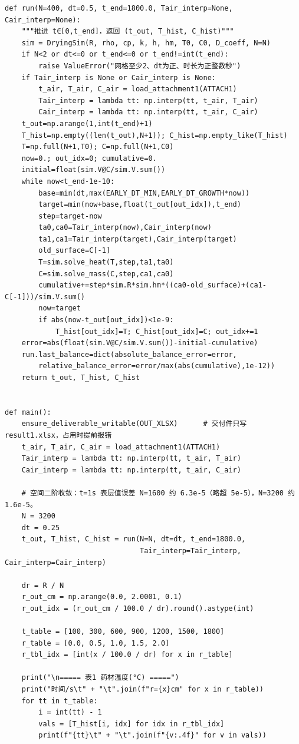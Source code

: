 \documentclass[12pt,a4paper]{ctexart}
\begin{document}
\begin{lstlisting}[caption={solve\_problem1.py }]
def run(N=400, dt=0.5, t_end=1800.0, Tair_interp=None, Cair_interp=None):
    """推进 t∈[0,t_end]，返回 (t_out, T_hist, C_hist)"""
    sim = DryingSim(R, rho, cp, k, h, hm, T0, C0, D_coeff, N=N)
    if N<2 or dt<=0 or t_end<=0 or t_end!=int(t_end):
        raise ValueError("网格至少2、dt为正、时长为正整数秒")
    if Tair_interp is None or Cair_interp is None:
        t_air, T_air, C_air = load_attachment1(ATTACH1)
        Tair_interp = lambda tt: np.interp(tt, t_air, T_air)
        Cair_interp = lambda tt: np.interp(tt, t_air, C_air)
    t_out=np.arange(1,int(t_end)+1)
    T_hist=np.empty((len(t_out),N+1)); C_hist=np.empty_like(T_hist)
    T=np.full(N+1,T0); C=np.full(N+1,C0)
    now=0.; out_idx=0; cumulative=0.
    initial=float(sim.V@C/sim.V.sum())
    while now<t_end-1e-10:
        base=min(dt,max(EARLY_DT_MIN,EARLY_DT_GROWTH*now))
        target=min(now+base,float(t_out[out_idx]),t_end)
        step=target-now
        ta0,ca0=Tair_interp(now),Cair_interp(now)
        ta1,ca1=Tair_interp(target),Cair_interp(target)
        old_surface=C[-1]
        T=sim.solve_heat(T,step,ta1,ta0)
        C=sim.solve_mass(C,step,ca1,ca0)
        cumulative+=step*sim.R*sim.hm*((ca0-old_surface)+(ca1-C[-1]))/sim.V.sum()
        now=target
        if abs(now-t_out[out_idx])<1e-9:
            T_hist[out_idx]=T; C_hist[out_idx]=C; out_idx+=1
    error=abs(float(sim.V@C/sim.V.sum())-initial-cumulative)
    run.last_balance=dict(absolute_balance_error=error,
        relative_balance_error=error/max(abs(cumulative),1e-12))
    return t_out, T_hist, C_hist


def main():
    ensure_deliverable_writable(OUT_XLSX)      # 交付件只写 result1.xlsx，占用时提前报错
    t_air, T_air, C_air = load_attachment1(ATTACH1)
    Tair_interp = lambda tt: np.interp(tt, t_air, T_air)
    Cair_interp = lambda tt: np.interp(tt, t_air, C_air)

    # 空间二阶收敛：t=1s 表层值误差 N=1600 约 6.3e-5（略超 5e-5），N=3200 约 1.6e-5。
    N = 3200
    dt = 0.25
    t_out, T_hist, C_hist = run(N=N, dt=dt, t_end=1800.0,
                                Tair_interp=Tair_interp, Cair_interp=Cair_interp)

    dr = R / N
    r_out_cm = np.arange(0.0, 2.0001, 0.1)
    r_out_idx = (r_out_cm / 100.0 / dr).round().astype(int)

    t_table = [100, 300, 600, 900, 1200, 1500, 1800]
    r_table = [0.0, 0.5, 1.0, 1.5, 2.0]
    r_tbl_idx = [int(x / 100.0 / dr) for x in r_table]

    print("\n===== 表1 药材温度(°C) =====")
    print("时间/s\t" + "\t".join(f"r={x}cm" for x in r_table))
    for tt in t_table:
        i = int(tt) - 1
        vals = [T_hist[i, idx] for idx in r_tbl_idx]
        print(f"{tt}\t" + "\t".join(f"{v:.4f}" for v in vals))


\end{lstlisting}
\end{document}

